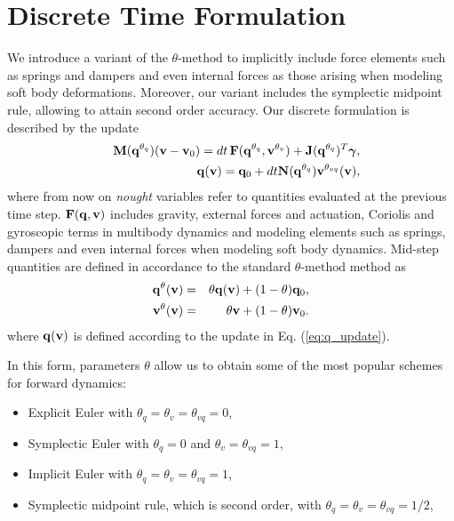 \section{Discrete Time Formulation}
\label{sec:discrete_formulation}

We introduce a variant of the $\theta\text{-method}$ to implicitly include force
elements such as springs and dampers and even internal forces as those arising
when modeling soft body deformations. Moreover, our variant includes the
symplectic midpoint rule, allowing to attain second order accuracy. Our
discrete formulation is described by the update
\begin{eqnarray}
	&&\mf{M}(\mf{q}^{\theta_{q}})(\mf{v}-\mf{v}_0) =
	dt\,\mf{F}(\mf{q}^{\theta_{q}}, \mf{v}^{\theta_v}) + \mf{J}(\mf{q}^{\theta_{q}})^T\mf{\bgamma},
	\label{eq:v_update}\\
	&&\mf{q}(\mf{v}) = \mf{q}_0 + dt\mf{N}(\mf{q}^{\theta_{q}})\mf{v}^{\theta_{vq}}(\mf{v}),
	\label{eq:q_update}
\end{eqnarray}
where from now on \textit{nought} variables refer to quantities evaluated at the
previous time step. ${\mathbf{F}}({\mathbf{q}}, {\mathbf{v}})$ includes gravity, external forces
and actuation, Coriolis and gyroscopic terms in multibody dynamics and modeling
elements such as springs, dampers and even internal forces when modeling soft
body dynamics. Mid-step quantities are defined in accordance to the standard
$\theta\text{-method}$ method as
\begin{eqnarray}
	{\mathbf{q}}^{\theta}({\mathbf{v}}) &=& \theta{\mathbf{q}}({\mathbf{v}}) + (1-\theta){\mathbf{q}}_0,\\
	{\mathbf{v}}^{\theta}({\mathbf{v}}) &=& \theta{\mathbf{v}} + (1-\theta){\mathbf{v}}_0.
\end{eqnarray}
where ${\mathbf{q}}({\mathbf{v}})$ is defined according to the update in Eq.
(\ref{eq:q_update}).

In this form, parameters $\theta$ allow us to obtain some of the most popular
schemes for forward dynamics:
\begin{itemize}
	\item Explicit Euler with $\theta_q=\theta_{v}=\theta_{vq} = 0$,
	\item Symplectic Euler with $\theta_{q} = 0$ and $\theta_v = \theta_{vq}=1$,
	\item Implicit Euler with $\theta_{q} = \theta_v = \theta_{vq}= 1$,
	\item Symplectic midpoint rule, which is second order, with $\theta_{q} =
	\theta_v = \theta_{vq}= 1/2$,
\end{itemize}

